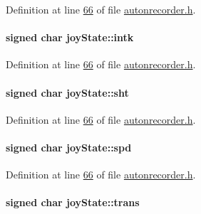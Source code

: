 Definition at line \hyperlink{autonrecorder_8h_source_l00066}{66} of file \hyperlink{autonrecorder_8h_source}{autonrecorder.\+h}.

\paragraph[{\texorpdfstring{intk}{intk}}]{\setlength{\rightskip}{0pt plus 5cm}signed char joy\+State\+::intk}\hypertarget{structjoy_state_a2314ed43be31ccc565381efd8398b921}{}\label{structjoy_state_a2314ed43be31ccc565381efd8398b921}


Definition at line \hyperlink{autonrecorder_8h_source_l00066}{66} of file \hyperlink{autonrecorder_8h_source}{autonrecorder.\+h}.

\paragraph[{\texorpdfstring{sht}{sht}}]{\setlength{\rightskip}{0pt plus 5cm}signed char joy\+State\+::sht}\hypertarget{structjoy_state_a751363be4e40b27bcbe558f41a15fe91}{}\label{structjoy_state_a751363be4e40b27bcbe558f41a15fe91}


Definition at line \hyperlink{autonrecorder_8h_source_l00066}{66} of file \hyperlink{autonrecorder_8h_source}{autonrecorder.\+h}.

\paragraph[{\texorpdfstring{spd}{spd}}]{\setlength{\rightskip}{0pt plus 5cm}signed char joy\+State\+::spd}\hypertarget{structjoy_state_a7867156ddb5bc22d57010c5af00c98af}{}\label{structjoy_state_a7867156ddb5bc22d57010c5af00c98af}


Definition at line \hyperlink{autonrecorder_8h_source_l00066}{66} of file \hyperlink{autonrecorder_8h_source}{autonrecorder.\+h}.

\paragraph[{\texorpdfstring{trans}{trans}}]{\setlength{\rightskip}{0pt plus 5cm}signed char joy\+State\+::trans}\hypertarget{structjoy_state_acc4f7bae078e8c8b7840cda61382c7cf}{}\label{structjoy_state_acc4f7bae078e8c8b7840cda61382c7cf}


